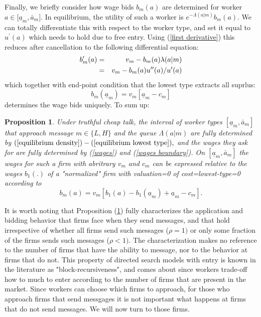 \documentclass[12pt]{article}
\theoremstyle{plain}
\newtheorem{prop}{Proposition}
\begin{document}
Finally, we briefly consider how wage bids $b_{m}(a)$ are determined for
worker $a\in \lbrack \underline{a}_{m},\bar{a}_{m}]$. In equilibrium, the
utility of such a worker is $e^{-\Lambda (a|m)}b_{m}(a)$. We can totally
differentiate this with respect to the worker type, and set it equal to $%
u^{\prime }(a)$ which needs to hold due to free entry. Using (\ref{first
derivative}) this reduces after cancellation to the following differential
equation: 
\begin{eqnarray}
b_{m}^{\prime }(a) &=&v_{m}-b_{m}(a)\lambda (a|m)  \notag \\
&=&v_{m}-b_{m}(a)u^{\prime \prime }(a)/u^{\prime }(a)  \label{wages}
\end{eqnarray}%
which together with end-point condition that the lowest type extracts all
suprlus: 
\begin{equation}
b_{m}(\underline{a}_{m})=v_{m}[\underline{a}_{m}-c_{m}]
\label{wages boundary}
\end{equation}%
determines the wage bids uniquely. To sum up:

\begin{prop}
\label{equilibrium-characterization}Under truthful cheap talk, the interval
of worker types $[\underline{a}_{m},\bar{a}_{m}]$ that approach message $%
m\in \{L,H\}$ and the queue $\Lambda (a|m)$ are fully determined by $(\ref%
{equilibrium density})-(\ref{equilibrium lowest type}),$ and the wages they
ask for are fully determined by (\ref{wages}) and (\ref{wages boundary}). On 
$[\underline{a}_{m},\bar{a}_{m}]$ the wages for such a firm with abritrary $%
v_{m}$ and $c_{m}$ can be expressed relative to the wages $b_{1}(.)$ of a
"normalized" firm with valuation=0 of cost=lowest-type=0 according to 
\begin{equation}
b_{m}(a)=v_{m}[b_{1}(a)-b_{1}(\underline{a}_{m})+\underline{a}_{m}-c_{m}].
\label{bidding1}
\end{equation}
\end{prop}

\bigskip

It is worth noting that Proposition (\ref{equilibrium-characterization})
fully characterizes the application and bidding behavior that firms face
when they send messages, and that hold irrespective of whether all firms
send such messages ($\rho =1)$ or only some fraction of the firms sends such
messages ($\rho <1).$ The characterization makes no reference to the number
of firms that have the ability to message, nor to the behavior at firms that
do not. This property of directed search models with entry is known in the
literature as "block-recursiveness", and comes about since workers trade-off
how to much to enter according to the number of firms that are present in
the market. Since workers can choose which firms to approach, for those who
approach firms that send messgages it is not important what happens at firms
that do not send messages. We will now turn to those firms.
\end{document}

